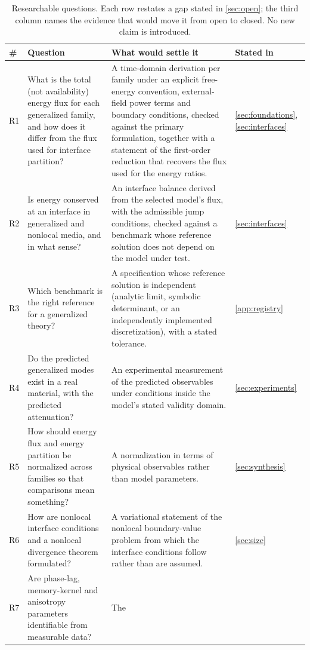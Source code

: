 \begin{table}[H]\centering\small
\caption{Researchable questions. Each row restates a gap stated in \cref{sec:open}; the third column
names the evidence that would move it from open to closed. No new claim is introduced.}
\label{tab:research-questions}
\begin{tabularx}{\textwidth}{@{}p{0.5cm}Y Y p{1.75cm}@{}}
\toprule
\textbf{\#} & \textbf{Question} & \textbf{What would settle it} & \textbf{Stated in} \\
\midrule
R1 & What is the total (not availability) energy flux for each generalized family, and how does it
  differ from the flux used for interface partition? & A time-domain derivation per family under an
  explicit free-energy convention, external-field power terms and boundary conditions, checked against
  the primary formulation, together with a statement of the first-order reduction that recovers the flux
  used for the energy ratios. & \cref{sec:foundations}, \cref{sec:interfaces} \\
R2 & Is energy conserved at an interface in generalized and nonlocal media, and in what sense? & An
  interface balance derived from the selected model's flux, with the admissible jump conditions, checked
  against a benchmark whose reference solution does not depend on the model under test. &
  \cref{sec:interfaces} \\
R3 & Which benchmark is the right reference for a generalized theory? & A specification whose reference
  solution is independent (analytic limit, symbolic determinant, or an independently implemented
  discretization), with a stated tolerance. & \cref{app:registry} \\
R4 & Do the predicted generalized modes exist in a real material, with the predicted attenuation? & An
  experimental measurement of the predicted observables under conditions inside the model's stated
  validity domain. & \cref{sec:experiments} \\
R5 & How should energy flux and energy partition be normalized across families so that comparisons mean
  something? & A normalization in terms of physical observables rather than model parameters. &
  \cref{sec:synthesis} \\
R6 & How are nonlocal interface conditions and a nonlocal divergence theorem formulated? & A variational
  statement of the nonlocal boundary-value problem from which the interface conditions follow rather than
  are assumed. & \cref{sec:size} \\
R7 & Are phase-lag, memory-kernel and anisotropy parameters identifiable from measurable data? & The

\end{tabularx}
\end{table}
